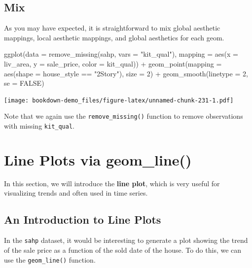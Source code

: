 \documentclass[
]{book}
\newenvironment{Shaded}{\begin{snugshade}}{\end{snugshade}}
\newcommand{\AttributeTok}[1]{\textcolor[rgb]{0.77,0.63,0.00}{#1}}
\newcommand{\ConstantTok}[1]{\textcolor[rgb]{0.00,0.00,0.00}{#1}}
\newcommand{\DecValTok}[1]{\textcolor[rgb]{0.00,0.00,0.81}{#1}}
\newcommand{\FunctionTok}[1]{\textcolor[rgb]{0.00,0.00,0.00}{#1}}
\newcommand{\NormalTok}[1]{#1}
\newcommand{\SpecialCharTok}[1]{\textcolor[rgb]{0.00,0.00,0.00}{#1}}
\newcommand{\StringTok}[1]{\textcolor[rgb]{0.31,0.60,0.02}{#1}}
\begin{document}
\hypertarget{mix}{%
\subsection{Mix}\label{mix}}

As you may have expected, it is straightforward to mix global aesthetic mappings, local aesthetic mappings, and global aesthetics for each geom.

\begin{Shaded}
\begin{Highlighting}[]
\FunctionTok{ggplot}\NormalTok{(}\AttributeTok{data =} \FunctionTok{remove\_missing}\NormalTok{(sahp, }\AttributeTok{vars =} \StringTok{"kit\_qual"}\NormalTok{), }\AttributeTok{mapping =} \FunctionTok{aes}\NormalTok{(}\AttributeTok{x =}\NormalTok{ liv\_area, }\AttributeTok{y =}\NormalTok{ sale\_price, }\AttributeTok{color =}\NormalTok{ kit\_qual)) }\SpecialCharTok{+} \FunctionTok{geom\_point}\NormalTok{(}\AttributeTok{mapping =} \FunctionTok{aes}\NormalTok{(}\AttributeTok{shape =}\NormalTok{ house\_style }\SpecialCharTok{==} \StringTok{"2Story"}\NormalTok{), }\AttributeTok{size =} \DecValTok{2}\NormalTok{) }\SpecialCharTok{+} \FunctionTok{geom\_smooth}\NormalTok{(}\AttributeTok{linetype =} \DecValTok{2}\NormalTok{, }\AttributeTok{se =} \ConstantTok{FALSE}\NormalTok{)}
\end{Highlighting}
\end{Shaded}

\texttt{[image: bookdown-demo\_files/figure-latex/unnamed-chunk-231-1.pdf]}

Note that we again use the \texttt{remove\_missing()} function to remove observations with missing \texttt{kit\_qual}.

\hypertarget{line-plot}{%
\section{Line Plots via geom\_line()}\label{line-plot}}

In this section, we will introduce the \textbf{line plot}, which is very useful for visualizing trends and often used in time series.

\hypertarget{an-introduction-to-line-plots}{%
\subsection{An Introduction to Line Plots}\label{an-introduction-to-line-plots}}

In the \texttt{sahp} dataset, it would be interesting to generate a plot showing the trend of the sale price as a function of the sold date of the house. To do this, we can use the \texttt{geom\_line()} function.
\end{document}
